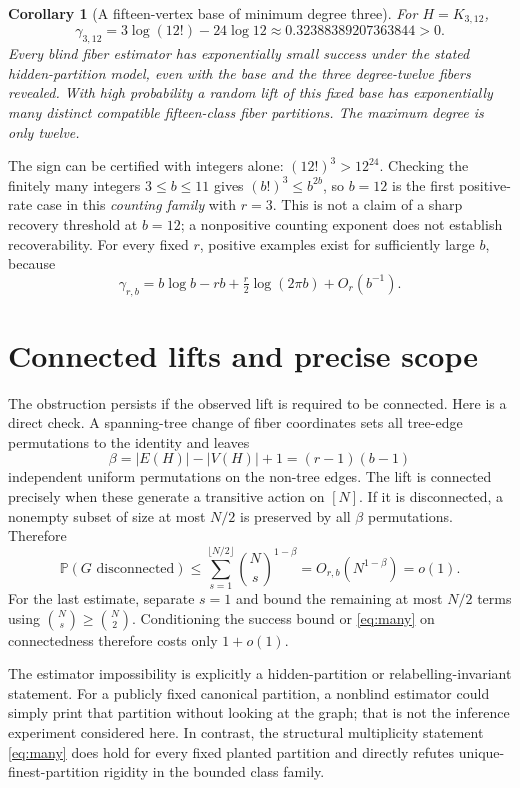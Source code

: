 \documentclass[11pt]{article}
\newtheorem{corollary}{Corollary}
\newcommand{\Prob}{\mathbb P}
\begin{document}
\begin{corollary}[A fifteen-vertex base of minimum degree three]
For $H=K_{3,12}$,
\[
 \gamma_{3,12}=3\log(12!)-24\log12
                 \approx0.32388389207363844>0.
\]
Every blind fiber estimator has exponentially small success under
the stated hidden-partition model, even with the base and the three
degree-twelve fibers revealed. With high probability a random
lift of this fixed base has exponentially many distinct compatible
fifteen-class fiber partitions. The maximum degree is only twelve.
\end{corollary}
The sign can be certified with integers alone:
$(12!)^3>12^{24}$. Checking the finitely many integers $3\le b\le11$
gives $(b!)^3\le b^{2b}$, so $b=12$ is the first positive-rate
case in this \emph{counting family} with $r=3$.
This is not a claim of a sharp recovery threshold at $b=12$;
a nonpositive counting exponent does not establish recoverability.
For every fixed $r$, positive examples exist for sufficiently large
$b$, because
\[
 \gamma_{r,b}=b\log b-rb+\tfrac r2\log(2\pi b)+O_r(b^{-1}).
\]

\section{Connected lifts and precise scope}
The obstruction persists if the observed lift is required to be
connected. Here is a direct check. A spanning-tree change of fiber
coordinates sets all tree-edge permutations to the identity and
leaves
\[
 \beta=|E(H)|-|V(H)|+1=(r-1)(b-1)
\]
independent uniform permutations on the non-tree edges. The lift is
connected precisely when these generate a transitive action on
$[N]$. If it is disconnected, a nonempty subset of size at most
$N/2$ is preserved by all $\beta$ permutations. Therefore
\[
 \Prob(G\text{ disconnected})
 \le\sum_{s=1}^{\lfloor N/2\rfloor}\binom Ns^{1-\beta}
 =O_{r,b}(N^{1-\beta})=o(1).
\]
For the last estimate, separate $s=1$ and bound the remaining at
most $N/2$ terms using $\binom Ns\ge\binom N2$.
Conditioning the success bound or \eqref{eq:many} on connectedness
therefore costs only $1+o(1)$.

The estimator impossibility is explicitly a hidden-partition or
relabelling-invariant statement. For a publicly fixed canonical
partition, a nonblind estimator could simply print that partition
without looking at the graph; that is not the inference experiment
considered here. In contrast, the structural multiplicity statement
\eqref{eq:many} does hold for every fixed planted partition and
directly refutes unique-finest-partition rigidity in the bounded
class family.
\end{document}

